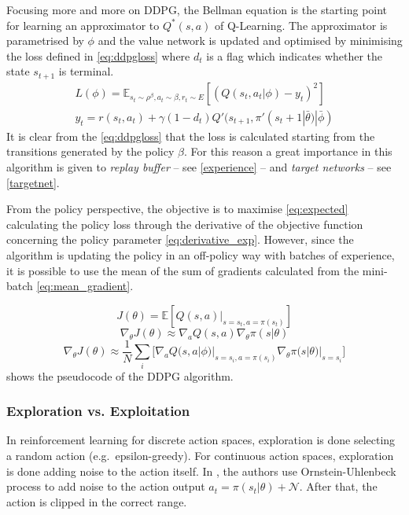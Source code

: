 Focusing more and more on DDPG, the Bellman equation is the starting point for learning an approximator to $Q^*(s,a)$ of Q-Learning.
The approximator is parametrised by $\phi$ and the value network is updated and optimised by minimising the loss defined in \vref{eq:ddpgloss} where $d_t$ is a flag which indicates whether the  state $s_{t+1}$ is terminal.
\begin{equation}\label{eq:ddpgloss}
	\begin{gathered}
		L(\phi) = \mathbb{E}_{s_t\sim \rho^\beta, a_t\sim \beta,r_t\sim E}[(Q(s_t, a_t|\phi)-y_t)^2] \\
		y_t = r(s_t, a_t) + \gamma (1-d_t)Q'(s_{t+1}, \pi'(s_t+1|\bar{\theta})|\bar{\phi})
	\end{gathered}
\end{equation}
It is clear from the \vref{eq:ddpgloss} that the loss is calculated starting from the transitions generated by the policy $\beta$.
For this reason a great importance in this algorithm is given to \textit{replay buffer} -- see \vref{experience} -- and \textit{target networks} -- see \vref{targetnet}.

From the policy perspective, the objective is to maximise \vref{eq:expected} calculating the policy loss through the derivative of the objective function concerning the policy parameter \vref{eq:derivative_exp}.
However, since the algorithm is updating the policy in an off-policy way with batches of experience, it is possible to use the mean of the sum of gradients calculated from the mini-batch \vref{eq:mean_gradient}.

\begin{equation}\label{eq:expected}
	J(\theta) = \mathbb{E}[Q(s,a)|_{s=s_t,a=\pi(s_t)}]
\end{equation}
\begin{equation}\label{eq:derivative_exp}
	\nabla_{\theta} J(\theta) \approx \nabla_a Q(s,a) \nabla_{\theta}\pi(s|\theta)
\end{equation}
\begin{equation}\label{eq:mean_gradient}
	\nabla_{\theta} J(\theta) \approx \frac{1}{N}\sum_{i}\big[\nabla_a Q(s,a| \phi)|_{s=s_i, a = \pi(s_i)} \nabla_{\theta}\pi(s|\theta)|_{s=s_i}\big]
\end{equation}
 shows the pseudocode of the DDPG algorithm.

\subsubsection{Exploration vs. Exploitation}
In reinforcement learning for discrete action spaces, exploration is done selecting a random action (e.g.\ epsilon-greedy).
For continuous action spaces, exploration is done adding noise to the action itself.
In \cite{lillicrap2015continuous}, the authors use Ornstein-Uhlenbeck process \cite{uhlenbeck1930theory} to add noise to the action output $
	a_t = \pi(s_t|\theta) + \mathcal{N}$.
After that, the action is clipped in the correct range.

